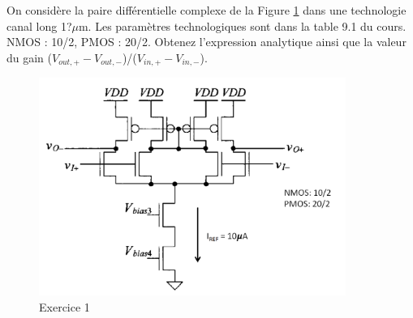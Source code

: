 \documentclass[frenchb,DIV=14]{scrartcl}
\begin{document}
On considère la paire différentielle complexe de la Figure \ref{fig11-2} dans une technologie canal long 1?$\mu$m. Les paramètres technologiques sont dans la table 9.1 du cours. NMOS : 10/2, PMOS : 20/2. 
Obtenez l'expression analytique ainsi que la valeur du gain ($V_{out,+}-V_{out,-}$)/($V_{in,+}-V_{in,-}$).
\begin{figure}[!htbp]
    \centering
    \includegraphics[width=10cm]{figures/fig11-2.png}
    \caption{Exercice 1}
    \label{fig11-2}
\end{figure}
\end{document}
